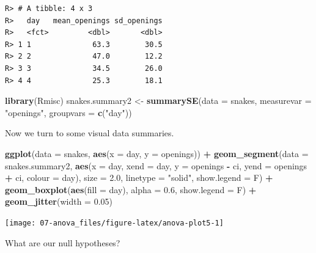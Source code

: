 \documentclass[english,10pt,a4paper,oneside]{book}
\newenvironment{Shaded}{\begin{snugshade}}{\end{snugshade}}
\newcommand{\DataTypeTok}[1]{\textcolor[rgb]{0.13,0.29,0.53}{#1}}
\newcommand{\FloatTok}[1]{\textcolor[rgb]{0.00,0.00,0.81}{#1}}
\newcommand{\KeywordTok}[1]{\textcolor[rgb]{0.13,0.29,0.53}{\textbf{#1}}}
\newcommand{\NormalTok}[1]{#1}
\newcommand{\OperatorTok}[1]{\textcolor[rgb]{0.81,0.36,0.00}{\textbf{#1}}}
\newcommand{\StringTok}[1]{\textcolor[rgb]{0.31,0.60,0.02}{#1}}
\theoremstyle{definition}
\theoremstyle{definition}
\theoremstyle{definition}
\theoremstyle{remark}
\begin{document}
\begin{verbatim}
R> # A tibble: 4 x 3
R>   day   mean_openings sd_openings
R>   <fct>         <dbl>       <dbl>
R> 1 1              63.3        30.5
R> 2 2              47.0        12.2
R> 3 3              34.5        26.0
R> 4 4              25.3        18.1
\end{verbatim}

\begin{Shaded}
\begin{Highlighting}[]
\KeywordTok{library}\NormalTok{(Rmisc)}
\NormalTok{snakes.summary2 <-}\StringTok{ }\KeywordTok{summarySE}\NormalTok{(}\DataTypeTok{data =}\NormalTok{ snakes, }\DataTypeTok{measurevar =} \StringTok{"openings"}\NormalTok{, }\DataTypeTok{groupvars =} \KeywordTok{c}\NormalTok{(}\StringTok{"day"}\NormalTok{))}
\end{Highlighting}
\end{Shaded}

Now we turn to some visual data summaries.

\begin{Shaded}
\begin{Highlighting}[]
\KeywordTok{ggplot}\NormalTok{(}\DataTypeTok{data =}\NormalTok{ snakes, }\KeywordTok{aes}\NormalTok{(}\DataTypeTok{x =}\NormalTok{ day, }\DataTypeTok{y =}\NormalTok{ openings)) }\OperatorTok{+}
\StringTok{  }\KeywordTok{geom_segment}\NormalTok{(}\DataTypeTok{data =}\NormalTok{ snakes.summary2, }\KeywordTok{aes}\NormalTok{(}\DataTypeTok{x =}\NormalTok{ day, }\DataTypeTok{xend =}\NormalTok{ day, }\DataTypeTok{y =}\NormalTok{ openings }\OperatorTok{-}\StringTok{ }\NormalTok{ci, }\DataTypeTok{yend =}\NormalTok{ openings }\OperatorTok{+}\StringTok{ }\NormalTok{ci, }\DataTypeTok{colour =}\NormalTok{ day),}
              \DataTypeTok{size =} \FloatTok{2.0}\NormalTok{, }\DataTypeTok{linetype =} \StringTok{"solid"}\NormalTok{, }\DataTypeTok{show.legend =}\NormalTok{ F) }\OperatorTok{+}
\StringTok{  }\KeywordTok{geom_boxplot}\NormalTok{(}\KeywordTok{aes}\NormalTok{(}\DataTypeTok{fill =}\NormalTok{ day), }\DataTypeTok{alpha =} \FloatTok{0.6}\NormalTok{, }\DataTypeTok{show.legend =}\NormalTok{ F) }\OperatorTok{+}\StringTok{ }
\StringTok{  }\KeywordTok{geom_jitter}\NormalTok{(}\DataTypeTok{width =} \FloatTok{0.05}\NormalTok{)}
\end{Highlighting}
\end{Shaded}

\texttt{[image: 07-anova\_files/figure-latex/anova-plot5-1]}

What are our null hypotheses?
\end{document}
